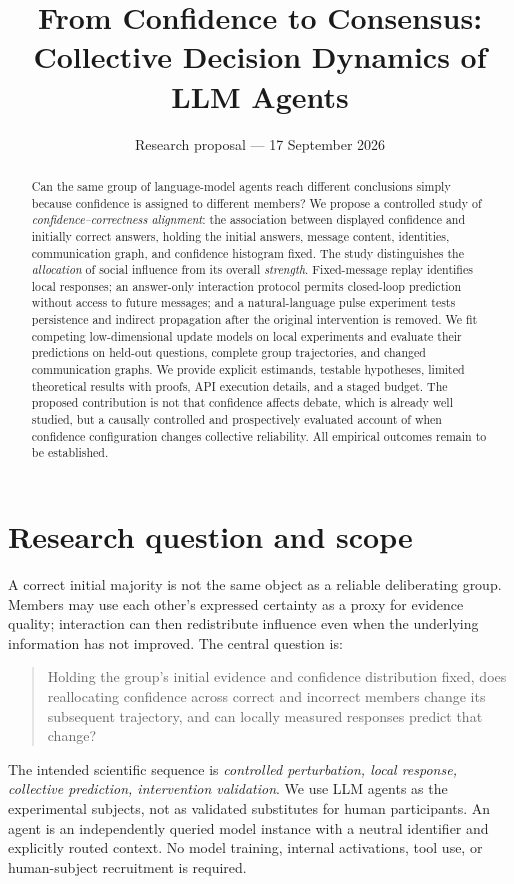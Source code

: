 \documentclass[11pt]{article}
\title{From Confidence to Consensus:\\Collective Decision Dynamics of LLM Agents}
\author{}
\date{Research proposal --- 17 September 2026}
\begin{document}
\maketitle
\begin{abstract}
Can the same group of language-model agents reach different conclusions simply because confidence is assigned to different members? We propose a controlled study of \emph{confidence--correctness alignment}: the association between displayed confidence and initially correct answers, holding the initial answers, message content, identities, communication graph, and confidence histogram fixed. The study distinguishes the \emph{allocation} of social influence from its overall \emph{strength}. Fixed-message replay identifies local responses; an answer-only interaction protocol permits closed-loop prediction without access to future messages; and a natural-language pulse experiment tests persistence and indirect propagation after the original intervention is removed. We fit competing low-dimensional update models on local experiments and evaluate their predictions on held-out questions, complete group trajectories, and changed communication graphs. We provide explicit estimands, testable hypotheses, limited theoretical results with proofs, API execution details, and a staged budget. The proposed contribution is not that confidence affects debate, which is already well studied, but a causally controlled and prospectively evaluated account of when confidence configuration changes collective reliability. All empirical outcomes remain to be established.
\end{abstract}

\section{Research question and scope}
A correct initial majority is not the same object as a reliable deliberating group. Members may use each other's expressed certainty as a proxy for evidence quality; interaction can then redistribute influence even when the underlying information has not improved. The central question is:
\begin{quote}
Holding the group's initial evidence and confidence distribution fixed, does reallocating confidence across correct and incorrect members change its subsequent trajectory, and can locally measured responses predict that change?
\end{quote}
The intended scientific sequence is \emph{controlled perturbation, local response, collective prediction, intervention validation}. We use LLM agents as the experimental subjects, not as validated substitutes for human participants. An agent is an independently queried model instance with a neutral identifier and explicitly routed context. No model training, internal activations, tool use, or human-subject recruitment is required.
\end{document}
